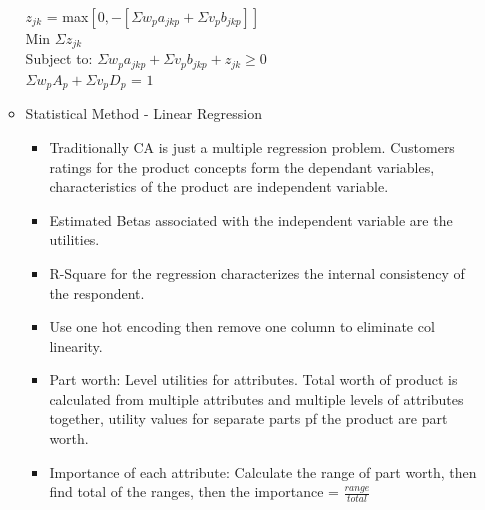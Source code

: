 \documentclass[a4paper]{article}
\begin{document}
\begin{enumerate}
\begin{itemize}
         $z_{jk}$ = max$[0, -[\Sigma w_pa_{jkp} + \Sigma v_pb_{jkp}]]$\\
         Min $\Sigma z_{jk}$\\
         Subject to: $\Sigma w_pa_{jkp} + \Sigma v_pb_{jkp} + z_{jk} \geq 0$\\
         $\Sigma w_pA_p + \Sigma v_pD_p$ = $1$
         \item Statistical Method - Linear Regression
         \begin{itemize}
             \item Traditionally CA is just a multiple regression problem. Customers ratings for the product concepts form the dependant variables, characteristics of the product are independent variable.
             \item Estimated Betas associated with the independent variable are the utilities.
             \item R-Square for the regression characterizes the internal consistency of the respondent.
             \item Use one hot encoding then remove one column to eliminate col linearity.
             \item Part worth: Level utilities for attributes. Total worth of product is calculated from multiple attributes and multiple levels of attributes together, utility values for separate parts pf the product are part worth.
             \item Importance of each attribute: Calculate the range of part worth, then find total of the ranges, then the importance = $\frac{range}{total}$
         \end{itemize}
     \end{itemize}
 \end{enumerate}
\end{document}

